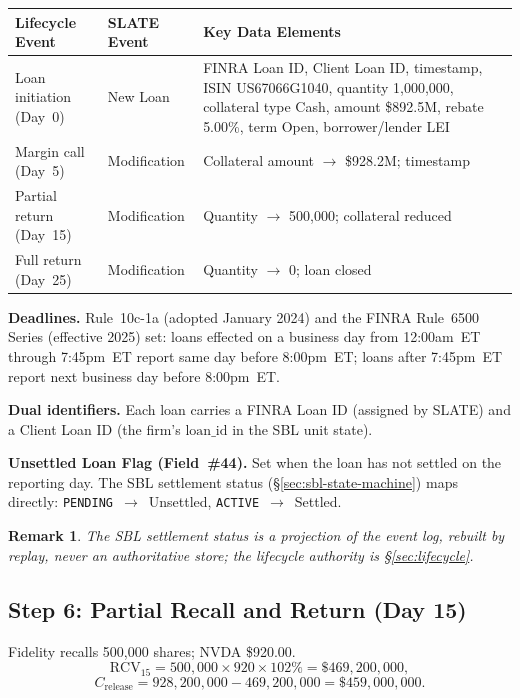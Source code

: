 \documentclass[11pt,a4paper]{article}
\newtheorem{remark}[definition]{Remark}
\begin{document}
\begin{center}\small
\begin{tabular}{l l p{6cm}}
\toprule
\textbf{Lifecycle Event} & \textbf{SLATE Event} & \textbf{Key Data Elements} \\
\midrule
Loan initiation (Day~0) & New Loan & FINRA Loan ID, Client Loan ID, timestamp, ISIN US67066G1040, quantity 1{,}000{,}000, collateral type Cash, amount \$892.5M, rebate 5.00\%, term Open, borrower/lender LEI \\
\midrule
Margin call (Day~5) & Modification & Collateral amount $\to$ \$928.2M; timestamp \\
\midrule
Partial return (Day~15) & Modification & Quantity $\to$ 500{,}000; collateral reduced \\
\midrule
Full return (Day~25) & Modification & Quantity $\to$ 0; loan closed \\
\bottomrule
\end{tabular}
\end{center}

\noindent\textbf{Deadlines.} Rule~10c-1a (adopted January 2024) and the FINRA Rule~6500 Series (effective 2025) set: loans effected on a business day from 12:00am~ET through 7:45pm~ET report same day before 8:00pm~ET; loans after 7:45pm~ET report next business day before 8:00pm~ET.

\noindent\textbf{Dual identifiers.} Each loan carries a FINRA Loan ID (assigned by SLATE) and a Client Loan ID (the firm's $\mathrm{loan\_id}$ in the SBL unit state).

\noindent\textbf{Unsettled Loan Flag (Field~\#44).} Set when the loan has not settled on the reporting day. The SBL settlement status (\S\ref{sec:sbl-state-machine}) maps directly: \texttt{PENDING}~$\to$~Unsettled, \texttt{ACTIVE}~$\to$~Settled.

\begin{remark}
The SBL settlement status is a projection of the event log, rebuilt by replay, never an authoritative store; the lifecycle authority is \S\ref{sec:lifecycle}.
\end{remark}

\subsection{Step 6: Partial Recall and Return (Day 15)}
\label{sec:us-step6}

Fidelity recalls 500{,}000 shares; NVDA \$920.00.
\[
\mathrm{RCV}_{15} = 500{,}000 \times 920 \times 102\% = \$469{,}200{,}000,
\]
\[
C_{\mathrm{release}} = 928{,}200{,}000 - 469{,}200{,}000 = \$459{,}000{,}000.
\]
\end{document}
